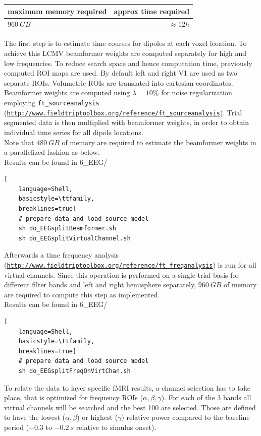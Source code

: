 \documentclass[12pt,a4paper]{scrartcl}
\begin{document}
\begin{table}[h]
\begin{tabular}{l | r}
\toprule
maximum memory required & approx time required\\\toprule
$960~GB$ & $\approx 12h$ \\\bottomrule
\end{tabular}
\end{table}
The first step is to estimate time courses for dipoles at each voxel lcoation. To achieve this LCMV beamformer weights are computed separately for high and low frequencies. To reduce search space and hence computation time, previously computed ROI maps are used. By default left and right V1 are used as two separate ROIs. Volumetric ROIs are translated into cartesian coordinates. Beamformer weights are computed using \texttt{$\lambda=10\%$} for noise regularization employing \texttt{ft\_sourceanalysis} (\href{http://www.fieldtriptoolbox.org/reference/ft\_sourceanalysis}{\nolinkurl{http://www.fieldtriptoolbox.org/reference/ft\_sourceanalysis}}). Trial segmented data is then multiplied with beamformer weights, in order to obtain individual time series for all dipole locations.\\
Note that $480~GB$ of memory are required to estimate the beamformer weights in a parallelized fashion as below.\\

\noindent Results can be found in 6\_EEG/\\
\begin{lstlisting}[
    language=Shell,
    basicstyle=\ttfamily,
    breaklines=true]
    # prepare data and load source model
    sh do_EEGsplitBeamformer.sh
    sh do_EEGsplitVirtualChannel.sh
\end{lstlisting}
Afterwards a time frequency analysis (\href{http://www.fieldtriptoolbox.org/reference/ft\_freqanalysis}{\nolinkurl{http://www.fieldtriptoolbox.org/reference/ft\_freqanalysis}}) is run for all virtual channels. Since this operation is performed on a single trial basis for different filter bands and left and right hemisphere separately, $960~GB$ of memory are required to compute this step as implemented.\\

\noindent Results can be found in 6\_EEG/\\
\begin{lstlisting}[
    language=Shell,
    basicstyle=\ttfamily,
    breaklines=true]
    # prepare data and load source model
    sh do_EEGsplitFreqOnVirtChan.sh
\end{lstlisting}
To relate the data to layer specific fMRI results, a channel selection has to take place, that is optimized for frequency ROIs ($\alpha, \beta, \gamma$). For each of the 3 bands all virtual channels will be searched and the best 100 are selected. Those are defined to have the lowest ($\alpha, \beta$) or highest ($\gamma$) relative power compared to the baseline period ($-0.3$ to $-0.2~s$ relative to simulus onset).\\
\end{document}
